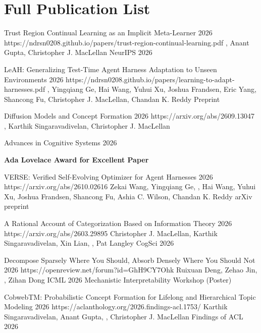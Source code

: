 \section{Full Publication List}

\CVPublication
  {Trust Region Continual Learning as an Implicit Meta-Learner}
  {2026}
  {https://ndrsn0208.github.io/papers/trust-region-continual-learning.pdf}
  {\CVNameInAuthors\CVEqual, Anant Gupta\CVEqual, Christopher J. MacLellan}
  {NeurIPS 2026}

\CVPublication
  {LeAH: Generalizing Test-Time Agent Harness Adaptation to Unseen Environments}
  {2026}
  {https://ndrsn0208.github.io/papers/learning-to-adapt-harnesses.pdf}
  {\CVNameInAuthors, Yingqiang Ge, Hai Wang, Yuhui Xu, Joshua Frandsen, Eric Yang,
   Shancong Fu, Christopher J. MacLellan, Chandan K. Reddy}
  {Preprint}

\CVPublication
  {Diffusion Models and Concept Formation}
  {2026}
  {https://arxiv.org/abs/2609.13047}
  {\CVNameInAuthors, Karthik Singaravadivelan, Christopher J. MacLellan}
  {Advances in Cognitive Systems 2026\par\nobreak
   \normalfont\textbf{Ada Lovelace Award for Excellent Paper}}

\CVPublication
  {VERSE: Verified Self-Evolving Optimizer for Agent Harnesses}
  {2026}
  {https://arxiv.org/abs/2610.02616}
  {Zekai Wang, Yingqiang Ge, \CVNameInAuthors, Hai Wang, Yuhui Xu,
   Joshua Frandsen, Shancong Fu, Ashia C. Wilson, Chandan K. Reddy}
  {arXiv preprint}

\CVPublication
  {A Rational Account of Categorization Based on Information Theory}
  {2026}
  {https://arxiv.org/abs/2603.29895}
  {Christopher J. MacLellan, Karthik Singaravadivelan, Xin Lian, \CVNameInAuthors, Pat Langley}
  {CogSci 2026}

\CVPublication
  {Decompose Sparsely Where You Should, Absorb Densely Where You Should Not}
  {2026}
  {https://openreview.net/forum?id=GhH9CY7Ohk}
  {Ruixuan Deng, Zehao Jin, \CVNameInAuthors, Zihan Dong}
  {ICML 2026 Mechanistic Interpretability Workshop (Poster)}

\CVPublication
  {CobwebTM: Probabilistic Concept Formation for Lifelong and Hierarchical Topic Modeling}
  {2026}
  {https://aclanthology.org/2026.findings-acl.1753/}
  {Karthik Singaravadivelan\CVEqual, Anant Gupta\CVEqual, \CVNameInAuthors, Christopher J. MacLellan}
  {Findings of ACL 2026}

